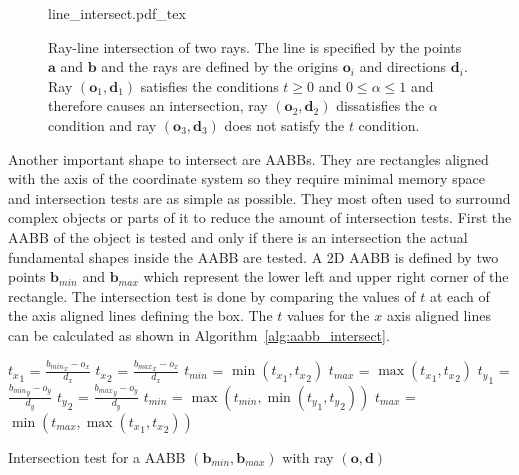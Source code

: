 \documentclass[a4paper,10pt]{article}
\renewcommand{\vec}[1]{\mathbf{#1}}
\newcommand{\algref}[1]{Algorithm~\ref{#1}}
\begin{document}
    \begin{center}
        \begin{figure}
            \centering    
            \def\svgwidth{0.8\textwidth}
            {line_intersect.pdf_tex}
            \caption[Ray-line intersection]{
                Ray-line intersection of two rays. The line is specified by
                the points $\vec{a}$ and $\vec{b}$ and the rays are 
                defined by
                the origins $\vec{o}_i$ and directions $\vec{d}_i$.
                Ray $(\vec{o}_1, \vec{d}_1)$ satisfies the conditions 
                $t \geq 0$ and $0 \leq \alpha \leq 1$
                and therefore causes an intersection, ray $(\vec{o}_2, \vec{d}_2)$
                dissatisfies the $\alpha$ condition and ray $(\vec{o}_3, \vec{d}_3)$
                does not satisfy the $t$ condition. 
            }
            \label{fig:line_intersect}
        \end{figure}
    \end{center}

    Another important shape to intersect are AABBs.
    They are rectangles aligned with the axis of the coordinate system
    so they require minimal memory space and intersection tests are
    as simple as possible.
    They most often used to surround complex objects or parts of it
    to reduce the amount of intersection tests.
    First the AABB of the object is tested and only if there is an
    intersection the actual fundamental shapes inside the AABB are tested.
    A 2D AABB is defined by two points $\vec{b}_{min}$ and $\vec{b}_{max}$ which
    represent the lower left and upper right corner of the rectangle.
    The intersection test is done by comparing the values of $t$ at each
    of the axis aligned lines defining the box.
    The $t$ values for the $x$ axis aligned lines can be calculated as
    shown in \algref{alg:aabb_intersect}.

    \begin{algorithm}
        \label{alg:aabb_intersect}
        \SetAlgoLined

        ${t_x}_1$ = $\frac{{b_{min}}_x - o_x}{d_x}$\;
        ${t_x}_2$ = $\frac{{b_{max}}_x - o_x}{d_x}$\;
        $t_{min}$ = $\min({t_x}_1, {t_x}_2)$\;
        $t_{max}$ = $\max({t_x}_1, {t_x}_2)$\;
        ${t_y}_1$ = $\frac{{b_{min}}_y - o_y}{d_y}$\;
        ${t_y}_2$ = $\frac{{b_{max}}_y - o_y}{d_y}$\;
        $t_{min}$ = $\max(t_{min}, \min({t_y}_1, {t_y}_2))$\;
        $t_{max}$ = $\min(t_{max}, \max({t_x}_1, {t_x}_2))$\;

        \caption[Intersection test for a AABB]{
        Intersection test for a AABB $(\vec{b}_{min}, \vec{b}_{max})$
        with ray $(\vec{o}, \vec{d})$
        }
    \end{algorithm}
\end{document}
